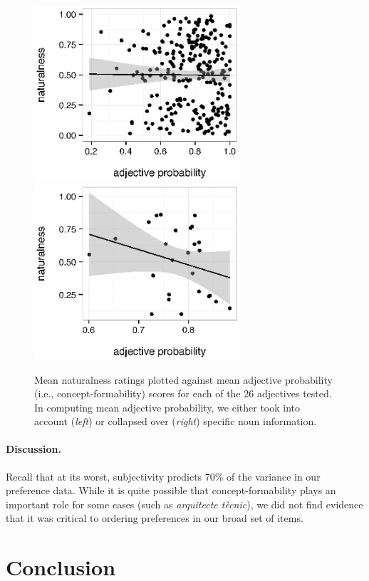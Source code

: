 \documentclass[12pt]{article}
\begin{document}
\renewcommand\thefigure{S.\arabic{figure}}
\begin{figure}
	\centering\includegraphics[width=3in]{plots/naturalness-concept-noun-pred.eps}\includegraphics[width=3in]{plots/naturalness-concept-adjective.eps}
	\caption{Mean naturalness ratings plotted against mean adjective probability (i.e., concept-formability) scores for each of the 26 adjectives tested. In computing mean adjective probability, we either took into account (\emph{left}) or collapsed over (\emph{right}) specific noun information.}\label{fig:concept}
\end{figure}

\paragraph{Discussion.} Recall that at its worst, subjectivity predicts 70\% of the variance in our preference data. 
While it is quite possible that concept-formability plays an important role for some cases (such as \emph{arquitecte t\`{e}cnic}), we did not find evidence that it was critical to ordering preferences in our broad set of items. 

\section{Conclusion}
\end{document}

